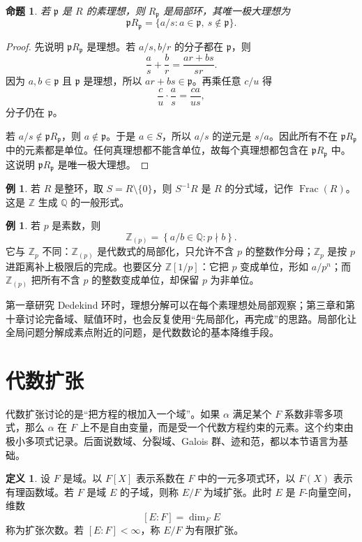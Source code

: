 \documentclass[11pt,a4paper,openany]{ctexbook}
\numberwithin{equation}{chapter}
\newcommand{\Q}{\mathbb{Q}}
\newcommand{\Z}{\mathbb{Z}}
\theoremstyle{plain}
\newtheorem{proposition}[theorem]{命题}
\theoremstyle{definition}
\newtheorem{definition}[theorem]{定义}
\newtheorem{example}[theorem]{例}
\theoremstyle{remark}
\begin{document}
\begin{proposition}
若 $\mathfrak p$ 是 $R$ 的素理想，则 $R_{\mathfrak p}$ 是局部环，其唯一极大理想为
\[
\mathfrak pR_{\mathfrak p}=\{a/s:a\in\mathfrak p,\ s\notin\mathfrak p\}.
\]
\end{proposition}

\begin{proof}
先说明 $\mathfrak pR_{\mathfrak p}$ 是理想。若 $a/s,b/r$ 的分子都在 $\mathfrak p$，则
\[
\frac a s+\frac b r=\frac{ar+bs}{sr}.
\]
因为 $a,b\in\mathfrak p$ 且 $\mathfrak p$ 是理想，所以 $ar+bs\in\mathfrak p$。再乘任意 $c/u$ 得
\[
\frac c u\cdot\frac a s=\frac{ca}{us},
\]
分子仍在 $\mathfrak p$。

若 $a/s\notin\mathfrak pR_{\mathfrak p}$，则 $a\notin\mathfrak p$。于是 $a\in S$，所以 $a/s$ 的逆元是 $s/a$。因此所有不在 $\mathfrak pR_{\mathfrak p}$ 中的元素都是单位。任何真理想都不能含单位，故每个真理想都包含在 $\mathfrak pR_{\mathfrak p}$ 中。这说明 $\mathfrak pR_{\mathfrak p}$ 是唯一极大理想。
\end{proof}

\begin{example}
若 $R$ 是整环，取 $S=R\setminus\{0\}$，则 $S^{-1}R$ 是 $R$ 的分式域，记作 $\operatorname{Frac}(R)$。这是 $\Z$ 生成 $\Q$ 的一般形式。
\end{example}

\begin{example}
若 $p$ 是素数，则
\[
\Z_{(p)}=\left\{a/b\in\Q:p\nmid b\right\}.
\]
它与 $\Z_p$ 不同：$\Z_{(p)}$ 是代数式的局部化，只允许不含 $p$ 的整数作分母；$\Z_p$ 是按 $p$ 进距离补上极限后的完成。也要区分 $\Z[1/p]$：它把 $p$ 变成单位，形如 $a/p^n$；而 $\Z_{(p)}$ 把所有不含 $p$ 的整数变成单位，却保留 $p$ 为非单位。
\end{example}

第一章研究 Dedekind 环时，理想分解可以在每个素理想处局部观察；第三章和第十章讨论完备域、赋值环时，也会反复使用“先局部化，再完成”的思路。局部化让全局问题分解成素点附近的问题，是代数数论的基本降维手段。

\section{代数扩张}

代数扩张讨论的是“把方程的根加入一个域”。如果 $\alpha$ 满足某个 $F$ 系数非零多项式，那么 $\alpha$ 在 $F$ 上不是自由变量，而是受一个代数方程约束的元素。这个约束由极小多项式记录。后面说数域、分裂域、Galois 群、迹和范，都以本节语言为基础。

\begin{definition}
设 $F$ 是域。以 $F[X]$ 表示系数在 $F$ 中的一元多项式环，以 $F(X)$ 表示有理函数域。若 $F$ 是域 $E$ 的子域，则称 $E/F$ 为域扩张。此时 $E$ 是 $F$-向量空间，维数
\[
[E:F]=\dim_F E
\]
称为扩张次数。若 $[E:F]<\infty$，称 $E/F$ 为有限扩张。
\end{definition}
\end{document}
